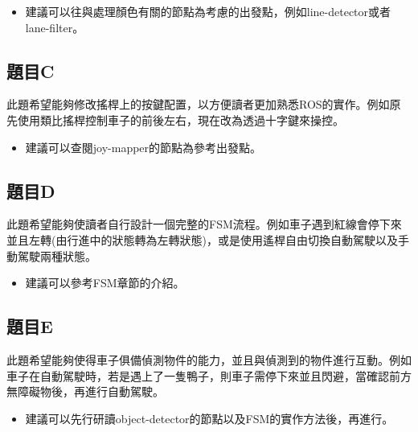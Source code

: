 \documentclass{article}
\begin{document}
\begin{itemize}

\item 建議可以往與處理顏色有關的節點為考慮的出發點，例如line-detector或者lane-filter。

\end{itemize}

\subsection{題目C}

此題希望能夠修改搖桿上的按鍵配置，以方便讀者更加熟悉ROS的實作。例如原先使用類比搖桿控制車子的前後左右，現在改為透過十字鍵來操控。

\begin{itemize}

\item 建議可以查閱joy-mapper的節點為參考出發點。
\end{itemize}

\subsection{題目D}

此題希望能夠使讀者自行設計一個完整的FSM流程。例如車子遇到紅線會停下來並且左轉(由行進中的狀態轉為左轉狀態)，或是使用遙桿自由切換自動駕駛以及手動駕駛兩種狀態。

\begin{itemize}

\item 建議可以參考FSM章節的介紹。

\end{itemize}

\subsection{題目E}

此題希望能夠使得車子俱備偵測物件的能力，並且與偵測到的物件進行互動。例如車子在自動駕駛時，若是遇上了一隻鴨子，則車子需停下來並且閃避，當確認前方無障礙物後，再進行自動駕駛。

\begin{itemize}

\item 建議可以先行研讀object-detector的節點以及FSM的實作方法後，再進行。

\end{itemize}
\end{document}
